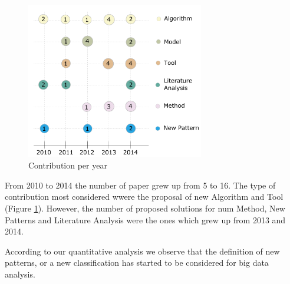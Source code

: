 \begin{figure}[hbtp]
\centering
\includegraphics[width=0.69\textwidth]{figs/ContributionPerYear.pdf}
\caption{Contribution per year}
\label{fig:contribution-per-year}
\end{figure}

From 2010 to 2014 the number of paper grew up from 5 to 16. The type of
contribution most considered wwere the proposal of new Algorithm and Tool
(Figure \ref{fig:contribution-per-year}). However, the number of proposed
solutions for num Method, New Patterns and Literature Analysis were the ones
which grew up from 2013 and 2014. 

According to our quantitative analysis we observe that the definition of new
patterns, or a new classification has started to be considered for big data
analysis. 




